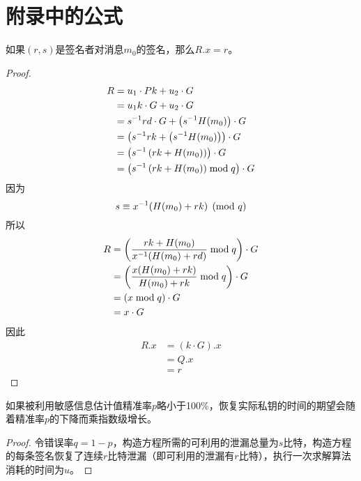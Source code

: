 \thispagestyle{appendixheader}
\setcounter{app_fig}{1}
\setcounter{app_tab}{1}
\setcounter{equation}{0}
\renewcommand\theequation{附\arabic{app}-\arabic{equation}}
\renewcommand\chaptername{附录}
\renewcommand\chaptername{Appendix} 
\renewcommand\thechapter{附录\zhnum{app}} 

\setcounter{chapter}{0}
\setcounter{section}{0}
\chapter{附录中的公式}\label{chap:app1}{
	\setcounter{app_fig}{1}
	\begin{proposition}\label{prop:ECDSA-authentication}
		如果$(r,s)$是签名者对消息$m_0$的签名，那么$R.x=r$。 
	\end{proposition}
	\begin{proof}
		\begin{align*}
			R&=u_1\cdot Pk+u_2\cdot G \\
			&= u_1k\cdot G+u_2\cdot G \\
			&= s^{-1}rd\cdot G+\left(s^{-1}H(m_0)\right)\cdot G \\
			&= \left(s^{-1}rk+\left(s^{-1}H(m_0)\right)\right)\cdot G \\
			&= \left(s^{-1}\left(rk+H(m_0)\right)\right)\cdot G \\
			&= \left(s^{-1}\left(rk+H(m_0)\right)\bmod q\right)\cdot G
		\end{align*}
		因为$$s\equiv x^{-1}(H(m_0)+rk) \pmod q$$
		所以\begin{align*}
			R&= \left(\frac{rk+H(m_0)}{x^{-1}(H(m_0)+rd)}\bmod q\right)\cdot G \\
			&= \left(\frac{x(H(m_0)+rk)}{H(m_0)+rk}\bmod q\right)\cdot G \\
			&= \left(x\bmod q\right)\cdot G \\
			&= x\cdot G
		\end{align*}
		因此\begin{align*}
			R.x&=\left(k\cdot G\right).x\\
			&=Q.x\\
			&=r
		\end{align*}
	\end{proof}
		
	\begin{proposition}\label{prop:expotime}
		如果被利用敏感信息估计值精准率$p$略小于100\%，恢复实际私钥的时间的期望会随着精准率$p$的下降而乘指数级增长。
	\end{proposition}
	\begin{proof}
		令错误率$q=1-p$，构造方程所需的可利用的泄漏总量为$s$比特，构造方程的每条签名恢复了连续$r$比特泄漏（即可利用的泄漏有$r$比特），执行一次求解算法消耗的时间为$u$。
		

\end{proof}}
